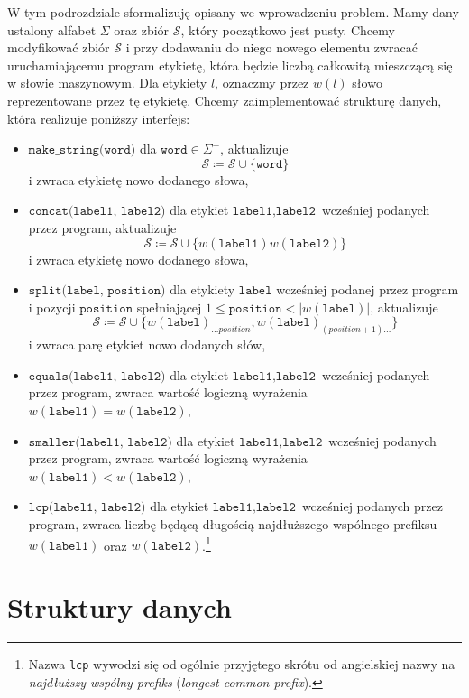 \documentclass[declaration,shortabstract]{iithesis}
\theoremstyle{definition} \newtheorem{definition}{Definicja}[chapter]
\theoremstyle{remark} \newtheorem{remark}[definition]{Obserwacja}
\theoremstyle{plain} \newtheorem{theorem}[definition]{Twierdzenie}
\theoremstyle{remark} \newtheorem{example}{Przykład}[definition]
\theoremstyle{plain} \newtheorem{lemma}[definition]{Lemat}
\begin{document}
W tym podrozdziale sformalizuję opisany we wprowadzeniu problem. Mamy dany ustalony alfabet $\Sigma$ oraz zbiór $\mathcal{S}$, który początkowo jest pusty. Chcemy modyfikować zbiór $\mathcal{S}$ i przy dodawaniu do niego nowego elementu zwracać uruchamiającemu program etykietę, która będzie liczbą całkowitą mieszczącą się w słowie maszynowym. Dla etykiety $l$, oznaczmy przez $w(l)$ słowo reprezentowane przez tę etykietę. Chcemy zaimplementować strukturę danych, która realizuje poniższy interfejs:
\begin{itemize}
    \item $\texttt{make\_string(word)}$ dla $\texttt{word} \in \Sigma^+$, aktualizuje $$\mathcal{S} \coloneqq \mathcal{S} \cup \{\texttt{word}\}$$ i zwraca etykietę nowo dodanego słowa,
    \item $\texttt{concat(label1, label2)}$ dla etykiet $\texttt{label1}, \texttt{label2}$ wcześniej podanych przez program, aktualizuje $$\mathcal{S} \coloneqq \mathcal{S} \cup \{w(\texttt{label1})w(\texttt{label2})\}$$ i zwraca etykietę nowo dodanego słowa,
    \item $\texttt{split(label, position)}$ dla etykiety $\texttt{label}$ wcześniej podanej przez program i pozycji $\texttt{position}$ spełniającej $1 \leq \texttt{position} < |w(\texttt{label})|$, aktualizuje $$\mathcal{S} \coloneqq \mathcal{S} \cup \{w(\texttt{label})_{\ldots position}, w(\texttt{label})_{(position+1) \ldots}\}$$ i zwraca parę etykiet nowo dodanych słów,
    \item $\texttt{equals(label1, label2)}$ dla etykiet $\texttt{label1}, \texttt{label2}$ wcześniej podanych przez program, zwraca wartość logiczną wyrażenia $w(\texttt{label1}) = w(\texttt{label2})$,
    \item $\texttt{smaller(label1, label2)}$ dla etykiet $\texttt{label1}, \texttt{label2}$ wcześniej podanych przez program, zwraca wartość logiczną wyrażenia $w(\texttt{label1}) < w(\texttt{label2})$,
    \item $\texttt{lcp(label1, label2)}$ dla etykiet $\texttt{label1}, \texttt{label2}$ wcześniej podanych przez program, zwraca liczbę będącą długością najdłuższego wspólnego prefiksu $w(\texttt{label1})$ oraz $w(\texttt{label2})$.\footnote{Nazwa \texttt{lcp} wywodzi się od ogólnie przyjętego skrótu od angielskiej nazwy na \textit{najdłuższy wspólny prefiks} (\textit{longest common prefix}).}
\end{itemize}

\chapter{Struktury danych}
\end{document}
